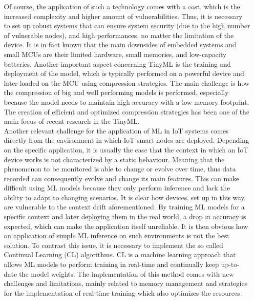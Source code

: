 \documentclass[12pt]{report}
\begin{document}
Of course, the application of such a technology comes with a cost, which is the increased complexity and higher amount of vulnerabilities. Thus, it is necessary to set up robust systems that can ensure system security (due to the high number of vulnerable nodes), and high performances, no matter the limitation of the device. It is in fact known that the main downsides of embedded systems and small MCUs are their limited hardware, small memories, and low-capacity batteries. Another important aspect concerning TinyML is the training and deployment of the model, which is typically performed on a powerful device and later loaded on the MCU using compression strategies. The main challenge is how the compression of big and well performing models is performed, especially because the model needs to maintain high accuracy with a low memory footprint. The creation of efficient and optimized compression strategies has been one of the main focus of recent research in the TinyML. \\
Another relevant challenge for the application of ML in IoT systems comes directly from the environment in which IoT smart nodes are deployed. Depending on the specific application, it is usually the case that the context in which an IoT device works is not characterized by a static behaviour. Meaning that the phenomenon to be monitored is able to change or evolve over time, thus data recorded can consequently evolve and change its main features. This can make difficult using ML models because they only perform inference and lack the ability to adapt to changing scenarios. It is clear how devices, set up in this way, are vulnerable to the context drift aforementioned.
By training ML models for a specific context and later deploying them in the real world, a drop in accuracy is expected, which can make the application itself unreliable. It is then obvious how an application of simple ML inference on such environments is not the best solution. To contrast this issue, it is necessary to implement the so called Continual Learning (CL) algorithms. CL is a machine learning approach that allows ML models to perform training in real-time and continually keep up-to-date the model weights. The implementation of this method comes with new challenges and limitations, mainly related to memory management and strategies for the implementation of real-time training which also optimizes the resources.
\bigskip
\end{document}
